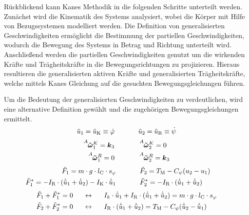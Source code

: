 Rückblickend kann Kanes Methodik in die folgenden Schritte unterteilt werden. Zunächst wird die Kinematik des Systems analysiert, wobei die Körper mit Hilfe von Bezugssystemen modelliert werden. Die Definition von generalisierten Geschwindigkeiten ermöglicht die Bestimmung der partiellen Geschwindigkeiten, wodurch die Bewegung des Systems in Betrag und Richtung unterteilt wird. Anschließend werden die partiellen Geschwindigkeiten genutzt um die wirkenden Kräfte und Trägheitskräfte in die Bewegungsrichtungen zu projizieren. Hieraus resultieren die generalisierten aktiven Kräfte und generalisierten Trägheitskräfte, welche mittels Kanes Gleichung auf die gesuchten Bewegungsgleichungen führen.

Um die Bedeutung der generalisierten Geschwindigkeiten zu verdeutlichen, wird eine alternative Definition gewählt und die zugehörigen Bewegungsgleichungen ermittelt.
\begin{equation}
\tilde{u}_{\text{1}} = \tilde{u}_{\text{K}} \equiv \dot{\varphi} \hspace{35pt} \tilde{u}_{\text{2}} = \tilde{u}_{\text{R}} \equiv \dot{\psi}
\end{equation}
\begin{equation}
\begin{split}
\vel{A}{\tilde{\omega}}{K}\idx{1} = \bs{k}\idx{3} &\hspace{35pt} \vel{A}{\tilde{\omega}}{K}\idx{2} = 0
\\
\vel{A}{\tilde{\omega}}{R}\idx{1} = 0 &\hspace{35pt} \vel{A}{\tilde{\omega}}{R}\idx{2} = \bs{k}\idx{3}
\end{split}
\end{equation}
\begin{equation}
\begin{split}
\tilde{F}_{\text{1}} = m\cdot g\cdot l_{\text{C}}\cdot s_{\varphi} \hspace{35pt}& \tilde{F}_{\text{2}} = T_{\text{M}} - C_{\psi}(u_{\text{2}}-u_{\text{1}}) \hspace{25pt}
\\
\tilde{F}^*_{\text{1}} = -I_{\text{R}}\cdot (\dot{\tilde{u}}_{\text{1}} + \dot{\tilde{u}}_{\text{2}}) - I_{\text{K}}\cdot \dot{\tilde{u}}_{\text{1}} \hspace{35pt}& \tilde{F}^*_{\text{2}} = -I_{\text{R}}\cdot (\dot{\tilde{u}}_{\text{1}} + \dot{\tilde{u}}_{\text{2}})\hspace{10pt}
\end{split}
\end{equation}
\begin{align}
\tilde{F}_{\text{1}} + \tilde{F}^*_{\text{1}} = 0 &\hspace{15pt}\leftrightarrow\hspace{15pt} I_k\cdot \dot{\tilde{u}}_{\text{1}} + I_{\text{R}}\cdot (\dot{\tilde{u}}_{\text{1}}+\dot{\tilde{u}}_{\text{2}}) = m\cdot g\cdot l_{\text{C}}\cdot s_{\varphi} \label{tilde_bwg_1}
\\
\tilde{F}_{\text{2}} + \tilde{F}^*_{\text{2}} = 0 &\hspace{15pt}\leftrightarrow\hspace{15pt} I_{\text{R}}\cdot (\dot{\tilde{u}}_{\text{1}}+\dot{\tilde{u}}_{\text{2}}) = T_{\text{M}} - C_{\psi}(\dot{\tilde{u}}_{\text{2}} - \dot{\tilde{u}}_{\text{1}}) \label{tilde_bwg_2}
\end{align}
